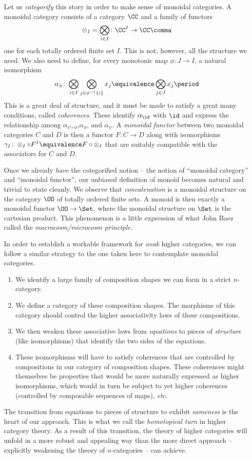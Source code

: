 Let us \emph{categorify} this story in order to make sense of monoidal categories.
A monoidal category consists of a category $\CC$ and a family of functors
\[
  \otimes_I = \bigotimes_{i \in I} \colon \CC^I \to \CC \comma
\]
one for each totally ordered finite set $I$.
This is not, however, all the structure we need.
We also need to define, for every monotonic map $\phi \colon J \to I$, a natural isomorphism
\[
  \alpha_{\phi} \colon \bigotimes_{i \in I} \bigotimes_{j \in \phi^{-1}\{i\}} x_j \equivalence \bigotimes_{j \in J} x_j \period
\]
This is a great deal of structure, and
it must be made to satisfy a great many conditions, called \emph{coherences}.
These identify $\alpha_{\id}$ with $\id$ and express the relationship among $\alpha_{\psi \circ \phi}$,$\alpha_{\phi}$, and $\alpha_{\psi}$.
A \emph{monoidal functor} between two monoidal categories $C$ and $D$ is then a functor $F \colon C \to D$ along with isomorphisms $\gamma_I \colon \otimes_I \circ F^I \equivalence F \circ \otimes_I$ that are suitably compatible with the associators for $C$ and $D$.

Once we already \emph{have} the categorified notion -- the notion of \enquote{monoidal category} and \enquote{monoidal functor}, our unbiased definition of monoid becomes natural and trivial to state cleanly.
We observe that \emph{concatenation} is a monoidal structure on the category $\OO$ of totally ordered finite sets.
A monoid is then exactly a monoidal functor $\OO \to \Set$, where the monoidal structure on $\Set$ is the cartesian product.
This phenomenon is a little expression of what John Baez called the \emph{macrocosm/microcosm principle}.

In order to establish a workable framework for \emph{weak} higher categories, we can follow a similar strategy to the one taken here to contemplate monoidal categories.
\begin{enumerate}
  \item We identify a large family of composition shapes we can form in a strict $n$-category.
  \item We define a category of these composition shapes.
    The morphisms of this category should control the higher associativity laws of these compositions.
  \item We then weaken these associative laws from \emph{equations} to pieces of \emph{structure} (like isomorphisms) that identify the two sides of the equations.
  \item These isomorphisms will have to satisfy coherences that are controlled by compositions in our category of composition shapes.
    These coherences might themselves be properties that would be more naturally expressed as higher isomorphisms,
    which would in turn be subject to yet higher coherences (controlled by composable sequences of maps), 
    \emph{etc}.
\end{enumerate}
The transition from equations to pieces of structure to exhibit \emph{sameness} is the heart of our approach.
This is what we call the \emph{homotopical turn} in higher category theory.
As a result of this transition, the theory of higher categories will unfold in a more robust and appealing way than the more direct approach -- explicitly weakening the theory of $n$-categories -- can achieve.
